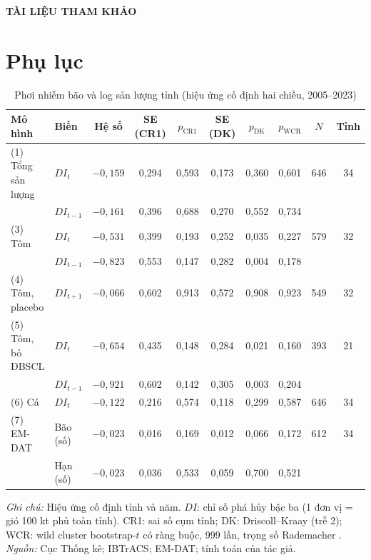 \documentclass[12pt,a4paper]{article}
\begin{document}
\clearpage
\begin{center}{\large\bfseries TÀI LIỆU THAM KHẢO}\end{center}
\printbibliography[heading=subbibliography,title={Tài liệu tham khảo tiếng Việt},keyword=vietnamese]
\printbibliography[heading=subbibliography,title={Tài liệu tham khảo tiếng Anh},keyword=english]

\clearpage
\appendix
\section*{Phụ lục}
\renewcommand{\thetable}{A\arabic{table}}
\setcounter{table}{0}

\begin{table}[!tbp]
\centering\scriptsize
\caption{Phơi nhiễm bão và log sản lượng tỉnh (hiệu ứng cố định hai chiều, 2005--2023)}
\label{tab:twfe}
\begin{tabular}{@{}llcccccccc@{}}
\toprule
Mô hình & Biến & Hệ số & SE (CR1) & $p_{\text{CR1}}$ & SE (DK) & $p_{\text{DK}}$ & $p_{\text{WCR}}$ & $N$ & Tỉnh \\
\midrule
(1) Tổng sản lượng & $DI_t$ & $-0{,}159$ & 0,294 & 0,593 & 0,173 & 0,360 & 0,601 & 646 & 34 \\
 & $DI_{t-1}$ & $-0{,}161$ & 0,396 & 0,688 & 0,270 & 0,552 & 0,734 & & \\
(3) Tôm & $DI_t$ & $-0{,}531$ & 0,399 & 0,193 & 0,252 & 0,035 & 0,227 & 579 & 32 \\
 & $DI_{t-1}$ & $-0{,}823$ & 0,553 & 0,147 & 0,282 & 0,004 & 0,178 & & \\
(4) Tôm, placebo & $DI_{t+1}$ & $-0{,}066$ & 0,602 & 0,913 & 0,572 & 0,908 & 0,923 & 549 & 32 \\
(5) Tôm, bỏ ĐBSCL & $DI_t$ & $-0{,}654$ & 0,435 & 0,148 & 0,284 & 0,021 & 0,160 & 393 & 21 \\
 & $DI_{t-1}$ & $-0{,}921$ & 0,602 & 0,142 & 0,305 & 0,003 & 0,204 & & \\
(6) Cá & $DI_t$ & $-0{,}122$ & 0,216 & 0,574 & 0,118 & 0,299 & 0,587 & 646 & 34 \\
(7) EM-DAT & Bão (số) & $-0{,}023$ & 0,016 & 0,169 & 0,012 & 0,066 & 0,172 & 612 & 34 \\
 & Hạn (số) & $-0{,}023$ & 0,036 & 0,533 & 0,059 & 0,700 & 0,521 & & \\
\bottomrule
\end{tabular}
\begin{minipage}{\textwidth}\footnotesize
\textit{Ghi chú:} Hiệu ứng cố định tỉnh và năm. $DI$: chỉ số phá hủy bậc ba (1 đơn vị = gió 100 kt phủ toàn tỉnh). CR1: sai số cụm tỉnh; DK: Driscoll--Kraay (trễ 2); WCR: wild cluster bootstrap-$t$ có ràng buộc, 999 lần, trọng số Rademacher \parencite{cameron2008,driscoll1998}. \textit{Nguồn:} Cục Thống kê; IBTrACS; EM-DAT; tính toán của tác giả.
\end{minipage}
\end{table}
\end{document}
